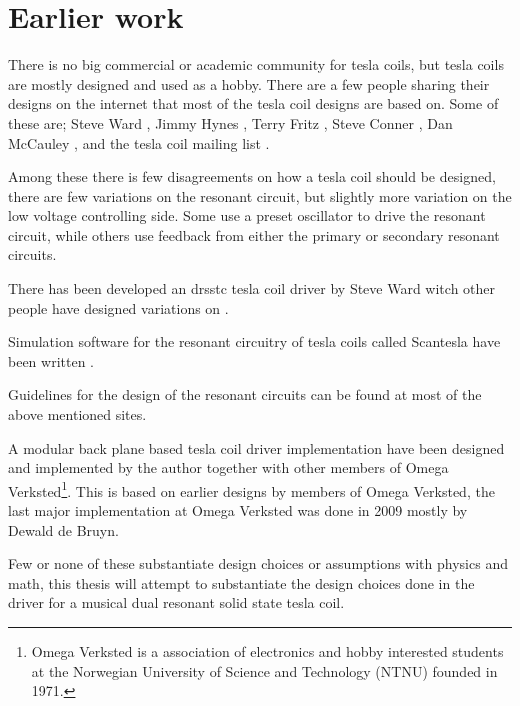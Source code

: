 \section{Earlier work}
There is no big commercial or academic community for tesla coils, but tesla coils are mostly designed and used as a hobby. There are a few people sharing their designs on the internet that most of the tesla coil designs are based on. Some of these are; Steve Ward , Jimmy Hynes , Terry Fritz , Steve Conner , Dan McCauley , and the tesla coil mailing list .

Among these there is few disagreements on how a tesla coil should be designed, there are few variations on the resonant circuit, but slightly more variation on the low voltage controlling side. Some use a preset oscillator to drive the resonant circuit, while others use feedback from either the primary or secondary resonant circuits.

There has been developed an drsstc tesla coil driver by Steve Ward witch other people have designed variations on .

Simulation software for the resonant circuitry of tesla coils called Scantesla have been written .

Guidelines for the design of the resonant circuits can be found at most of the above mentioned sites.

A modular back plane based tesla coil driver implementation have been designed and implemented by the author together with other members of Omega Verksted\footnote{Omega Verksted is a association of electronics and hobby interested students at the Norwegian University of Science and Technology (NTNU) founded in 1971.}. This is based on earlier designs by members of Omega Verksted, the last major implementation at Omega Verksted was done in 2009 mostly by Dewald de Bruyn.

Few or none of these substantiate design choices or assumptions with physics and math, this thesis will attempt to substantiate the design choices done in the driver for a musical dual resonant solid state tesla coil.


